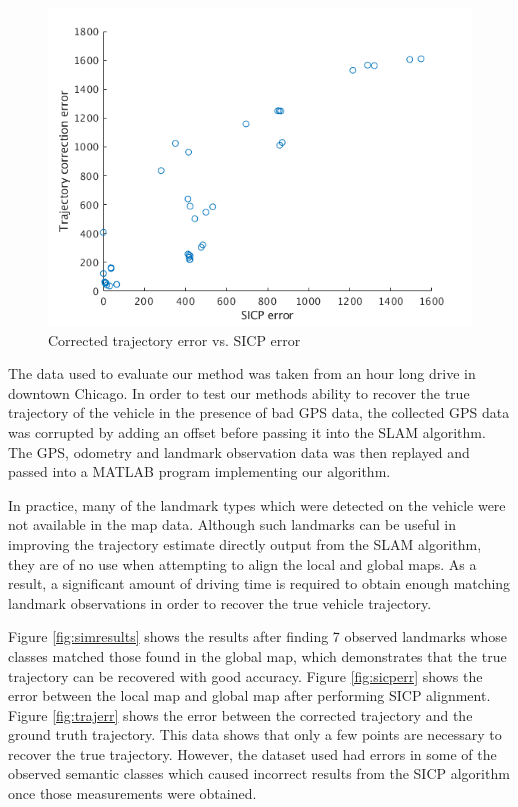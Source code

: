 \documentclass[letterpaper, 10 pt, conference]{ieeeconf}  %
\begin{document}
\begin{figure}[thpb]
  \centering
  \includegraphics[width=\linewidth]{sicp_traj_err.png}
  \caption{Corrected trajectory error vs. SICP error}
  \label{fig:sicptrajerr}
\end{figure}

The data used to evaluate our method was taken from an hour long drive in downtown Chicago.
In order to test our methods ability to recover the true trajectory of the vehicle in the presence of bad GPS data, the collected GPS data was corrupted by adding an offset before passing it into the SLAM algorithm.
The GPS, odometry and landmark observation data was then replayed and passed into a MATLAB program implementing our algorithm.

In practice, many of the landmark types which were detected on the vehicle were not available in the map data. Although such landmarks can be useful in improving the trajectory estimate directly output from the SLAM algorithm, they are of no use when attempting to align the local and global maps.
As a result, a significant amount of driving time is required to obtain enough matching landmark observations in order to recover the true vehicle trajectory.

Figure \ref{fig:simresults} shows the results after finding 7 observed landmarks whose classes matched those found in the global map, which demonstrates that the true trajectory can be recovered with good accuracy.
Figure \ref{fig:sicperr} shows the error between the local map and global map after performing SICP alignment.
Figure \ref{fig:trajerr} shows the error between the corrected trajectory and the ground truth trajectory. This data shows that only a few points are necessary to recover the true trajectory. However, the dataset used had errors in some of the observed semantic classes which caused incorrect results from the SICP algorithm once those measurements were obtained.
\end{document}
